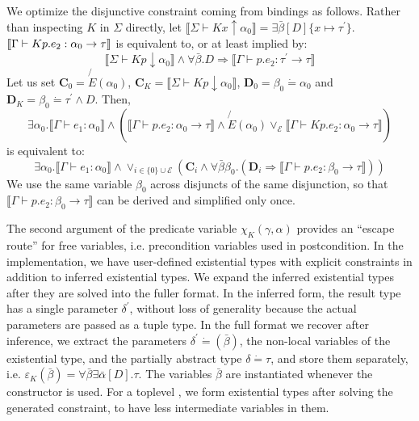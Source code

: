 \documentclass{article}
\newcommand{\nosymbol}{}
\newcommand{\tmmathbf}[1]{\ensuremath{\boldsymbol{#1}}}
\newcommand{\tmverbatim}[1]{{\ttfamily{#1}}}
\begin{document}
We optimize the disjunctive constraint coming from \tmverbatim{let} bindings
as follows. Rather than inspecting $K$ in $\Sigma$ directly, let $\llbracket
\Sigma \vdash K x \uparrow \alpha_0 \rrbracket = \exists \bar{\beta} [D] \{ x
\mapsto \tau^{\prime} \}$. $\left\llbracket \Gamma \vdash K p.e_2 : {\nobreak}
\alpha_0 \rightarrow {\nobreak} \tau \right\rrbracket$ is equivalent to, or at
least implied by:
\[ \llbracket \Sigma \vdash K p \downarrow \alpha_0 \rrbracket \wedge \forall
   \bar{\beta} .D \Rightarrow \llbracket \Gamma \vdash p.e_2 : \tau^{\prime}
   \rightarrow \tau \rrbracket \]
Let us set $\tmmathbf{C}_0 = \not{E} (\alpha_0)$, $\tmmathbf{C}_K = \llbracket
\Sigma \vdash K p \downarrow \alpha_0 \rrbracket$, $\tmmathbf{D}_0 = \beta_0
\dot{=} \alpha_0$ and $\tmmathbf{D}_K = \beta_0 \dot{=} \tau^{\prime} \wedge
D$. Then,
\[ \exists \alpha_0 . \llbracket \Gamma \vdash e_1 : \alpha_0 \rrbracket
   \wedge \left( \llbracket \Gamma \vdash p.e_2 : \alpha_0 \rightarrow \tau
   \rrbracket \wedge \not{E} (\alpha_0) \vee_{\mathcal{E}} \llbracket \Gamma
   \vdash K p.e_2 : \alpha_0 \rightarrow \tau \rrbracket \right) \]
is equivalent to:
\[ \exists \alpha_0 . \llbracket \Gamma \vdash e_1 : \alpha_0 \rrbracket
   \wedge \vee_{i \in \{ 0 \} \cup \mathcal{E}} (\tmmathbf{C}_i \wedge \forall
   \bar{\beta} \beta_0 . (\tmmathbf{D}_i \Rightarrow \llbracket \Gamma \vdash
   p.e_2 : \beta_0 \rightarrow \tau \rrbracket)) \]
We use the same variable $\beta_0$ across disjuncts of the same disjunction,
so that $\llbracket \Gamma \vdash p.e_2 : \beta_0 \rightarrow \tau \rrbracket$
can be derived and simplified only once.

The second argument of the predicate variable $\chi_K (\gamma, \alpha)
\nosymbol$ provides an ``escape route'' for free variables, i.e. precondition
variables used in postcondition. In the implementation, we have user-defined
existential types with explicit constraints in addition to inferred
existential types. We expand the inferred existential types after they are
solved into the fuller format. In the inferred form, the result type has a
single parameter $\delta^{\prime}$, without loss of generality because the
actual parameters are passed as a tuple type. In the full format we recover
after inference, we extract the parameters $\delta^{\prime} \dot{=}
(\bar{\beta})$, the non-local variables of the existential type, and the
partially abstract type $\delta \dot{=} \tau$, and store them separately, i.e.
$\varepsilon_K (\bar{\beta}) = \forall \bar{\beta} \exists \bar{\alpha} [D] .
\tau$. The variables $\bar{\beta}$ are instantiated whenever the constructor
is used. For a toplevel \tmverbatim{let}, we form existential types after
solving the generated constraint, to have less intermediate variables in them.
\end{document}
